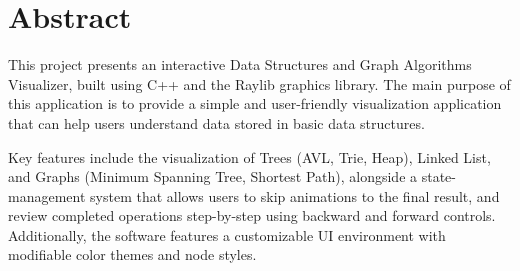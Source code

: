\section{Abstract}
This project presents an interactive Data Structures and Graph Algorithms Visualizer, built using C++ and the Raylib graphics library. The main purpose of this application is to provide a simple and user-friendly visualization application that can help users understand data stored in basic data structures.

Key features include the visualization of Trees (AVL, Trie, Heap), Linked List, and Graphs (Minimum Spanning Tree, Shortest Path), alongside a state-management system that allows users to skip animations to the final result, and review completed operations step-by-step using backward and forward controls. Additionally, the software features a customizable UI environment with modifiable color themes and node styles.